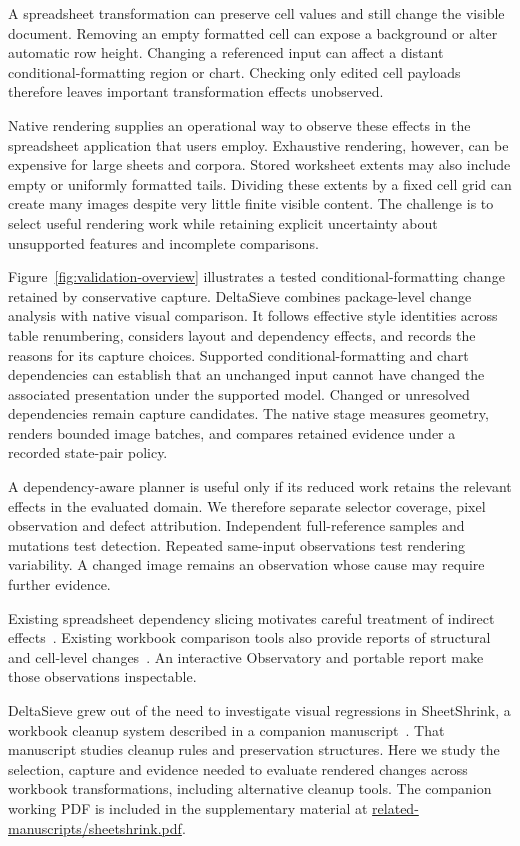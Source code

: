 A spreadsheet transformation can preserve cell values and still change the
visible document. Removing an empty formatted cell can expose a background or
alter automatic row height. Changing a referenced input can affect a distant
conditional-formatting region or chart. Checking only edited cell payloads
therefore leaves important transformation effects unobserved.

Native rendering supplies an operational way to observe these effects in the
spreadsheet application that users employ. Exhaustive rendering, however, can
be expensive for large sheets and corpora. Stored worksheet extents may also
include empty or uniformly formatted tails. Dividing these extents by a fixed
cell grid can create many images despite very little finite visible content.
The challenge is to select useful rendering work while retaining explicit
uncertainty about unsupported features and incomplete comparisons.

Figure~\ref{fig:validation-overview} illustrates a tested conditional-formatting
change retained by conservative capture.
DeltaSieve combines package-level change analysis with native visual comparison.
It follows effective style identities across table renumbering, considers
layout and dependency effects, and records the reasons for its capture choices.
Supported conditional-formatting and chart dependencies can establish that an
unchanged input cannot have changed the associated presentation under the
supported model. Changed or unresolved dependencies remain capture candidates.
The native stage measures geometry, renders bounded image batches, and compares
retained evidence under a recorded state-pair policy.

A dependency-aware planner is useful only if its reduced work retains the
relevant effects in the evaluated domain. We therefore separate selector
coverage, pixel observation and defect attribution. Independent full-reference
samples and mutations test detection. Repeated same-input observations test
rendering variability. A changed image remains an observation whose cause may
require further evidence.

Existing spreadsheet dependency slicing motivates careful treatment of indirect
effects~\cite{slicing}. Existing workbook comparison tools also provide reports
of structural and cell-level changes~\cite{spreadsheetcompare}. An interactive Observatory and portable report
make those observations inspectable.

DeltaSieve grew out of the need to investigate visual regressions in SheetShrink,
a workbook cleanup system described in a companion manuscript~\cite{sheetshrinkcompanion}.
That manuscript studies cleanup rules and preservation structures. Here we
study the selection, capture and evidence needed to evaluate rendered changes
across workbook transformations, including alternative cleanup tools.
The companion working PDF is included in the supplementary material at
\url{related-manuscripts/sheetshrink.pdf}.
